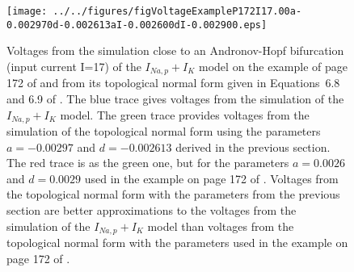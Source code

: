 \documentclass{article}
\theoremstyle{lemma}
\begin{document}
\begin{center}
\begin{figure}
\texttt{[image: ../../figures/figVoltageExampleP172I17.00a-0.002970d-0.002613aI-0.002600dI-0.002900.eps]}

\caption{Voltages from the simulation close to an Andronov-Hopf bifurcation
(input current I=17) of the $I_{Na,p}+I_K$ model on the example of page 172 of
\citet{izhikevich07} and from its topological normal form given in Equations~6.8 and 6.9 of \citet{izhikevich07}. The blue trace gives voltages from
the simulation of the $I_{Na,p}+I_K$ model. The green trace provides voltages
from the simulation of the topological normal form using the parameters
$a=-0.00297$ and $d=-0.002613$ derived in the previous section. The red trace
is as the green one, but for the parameters $a=0.0026$ and $d=0.0029$ used in
the example on page 172 of \citet{izhikevich07}. Voltages from the topological
normal form with the parameters from the previous section are better
approximations to the voltages from the simulation of the $I_{Na,p}+I_K$ model
than voltages from the topological normal form with the parameters used in the
example on page 172 of \citet{izhikevich07}.}

\label{fig:voltages} 
\end{figure} 
\end{center}



\end{document}
